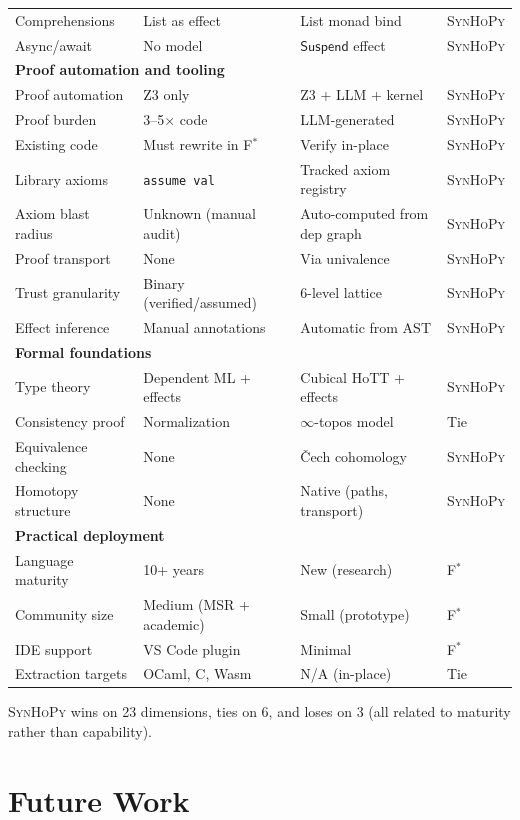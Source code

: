 \documentclass[11pt,a4paper]{report}
\theoremstyle{definition}
\theoremstyle{plain}
\newcommand{\fstar}{F$^{*}$}
\newcommand{\synhopy}{\textsc{SynHoPy}}
\begin{document}
\begin{longtable}{p{4cm}p{4.5cm}p{4.5cm}p{1.5cm}}
Comprehensions & List as effect & List monad bind & \synhopy{} \\
Async/await & No model & $\mathsf{Suspend}$ effect & \synhopy{} \\
\midrule
\multicolumn{4}{l}{\textbf{Proof automation and tooling}} \\
\midrule
Proof automation & Z3 only & Z3 + LLM + kernel & \synhopy{} \\
Proof burden & 3--5$\times$ code & LLM-generated & \synhopy{} \\
Existing code & Must rewrite in F$^*$ & Verify in-place & \synhopy{} \\
Library axioms & \lstinline[style=fstar]|assume val| & Tracked axiom registry & \synhopy{} \\
Axiom blast radius & Unknown (manual audit) & Auto-computed from dep graph & \synhopy{} \\
Proof transport & None & Via univalence & \synhopy{} \\
Trust granularity & Binary (verified/assumed) & 6-level lattice & \synhopy{} \\
Effect inference & Manual annotations & Automatic from AST & \synhopy{} \\
\midrule
\multicolumn{4}{l}{\textbf{Formal foundations}} \\
\midrule
Type theory & Dependent ML + effects & Cubical HoTT + effects & \synhopy{} \\
Consistency proof & Normalization & $\infty$-topos model & Tie \\
Equivalence checking & None & Čech cohomology & \synhopy{} \\
Homotopy structure & None & Native (paths, transport) & \synhopy{} \\
\midrule
\multicolumn{4}{l}{\textbf{Practical deployment}} \\
\midrule
Language maturity & 10+ years & New (research) & \fstar{} \\
Community size & Medium (MSR + academic) & Small (prototype) & \fstar{} \\
IDE support & VS Code plugin & Minimal & \fstar{} \\
Extraction targets & OCaml, C, Wasm & N/A (in-place) & Tie \\
\bottomrule
\end{longtable}

\synhopy{} wins on 23 dimensions, ties on 6, and loses on 3 (all related to
maturity rather than capability).


\chapter{Future Work}
\label{app:future}
\end{document}
